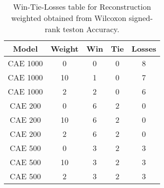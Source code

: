 \begin{table}[H]
\centering
\begin{tabular}{|c|c|c|c|c|}

\textbf{Model} & \textbf{Weight} &  \textbf{Win} &  \textbf{Tie} &  \textbf{Losses} \\
\hline

      CAE 1000 &               0 &             0 &             0 &                8 \\
\hline
      CAE 1000 &              10 &             1 &             0 &                7 \\
\hline
      CAE 1000 &               2 &             2 &             0 &                6 \\
\hline
       CAE 200 &               0 &             6 &             2 &                0 \\
\hline
       CAE 200 &              10 &             6 &             2 &                0 \\
\hline
       CAE 200 &               2 &             6 &             2 &                0 \\
\hline
       CAE 500 &               0 &             3 &             2 &                3 \\
\hline
       CAE 500 &              10 &             3 &             2 &                3 \\
\hline
       CAE 500 &               2 &             3 &             2 &                3 \\
\hline

\end{tabular}
\caption{Win-Tie-Losses table for Reconstruction weighted obtained from Wilcoxon signed-rank teston Accuracy.}
\label{tab:reconstruction_weighted_weighted_comparison_all}
\end{table}